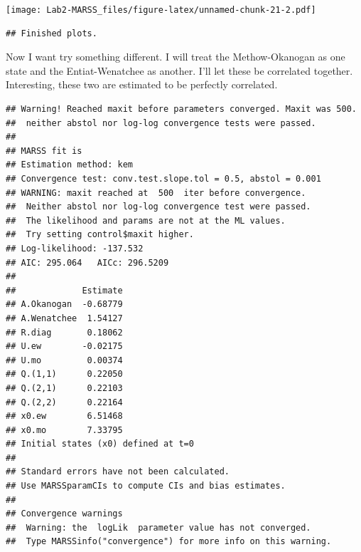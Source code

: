 \documentclass[
]{article}
\newenvironment{Shaded}{\begin{snugshade}}{\end{snugshade}}
\newcommand{\AttributeTok}[1]{\textcolor[rgb]{0.77,0.63,0.00}{#1}}
\newcommand{\FunctionTok}[1]{\textcolor[rgb]{0.00,0.00,0.00}{#1}}
\newcommand{\NormalTok}[1]{#1}
\newcommand{\OtherTok}[1]{\textcolor[rgb]{0.56,0.35,0.01}{#1}}
\newcommand{\SpecialCharTok}[1]{\textcolor[rgb]{0.00,0.00,0.00}{#1}}
\newcommand{\StringTok}[1]{\textcolor[rgb]{0.31,0.60,0.02}{#1}}
\begin{document}
\texttt{[image: Lab2-MARSS\_files/figure-latex/unnamed-chunk-21-2.pdf]}

\begin{verbatim}
## Finished plots.
\end{verbatim}

Now I want try something different. I will treat the Methow-Okanogan as
one state and the Entiat-Wenatchee as another. I'll let these be
correlated together. Interesting, these two are estimated to be
perfectly correlated.

\begin{Shaded}
\end{Shaded}

\begin{verbatim}
## Warning! Reached maxit before parameters converged. Maxit was 500.
##  neither abstol nor log-log convergence tests were passed.
## 
## MARSS fit is
## Estimation method: kem 
## Convergence test: conv.test.slope.tol = 0.5, abstol = 0.001
## WARNING: maxit reached at  500  iter before convergence.
##  Neither abstol nor log-log convergence test were passed.
##  The likelihood and params are not at the ML values.
##  Try setting control$maxit higher.
## Log-likelihood: -137.532 
## AIC: 295.064   AICc: 296.5209   
##  
##             Estimate
## A.Okanogan  -0.68779
## A.Wenatchee  1.54127
## R.diag       0.18062
## U.ew        -0.02175
## U.mo         0.00374
## Q.(1,1)      0.22050
## Q.(2,1)      0.22103
## Q.(2,2)      0.22164
## x0.ew        6.51468
## x0.mo        7.33795
## Initial states (x0) defined at t=0
## 
## Standard errors have not been calculated. 
## Use MARSSparamCIs to compute CIs and bias estimates.
## 
## Convergence warnings
##  Warning: the  logLik  parameter value has not converged.
##  Type MARSSinfo("convergence") for more info on this warning.
\end{verbatim}
\end{document}
